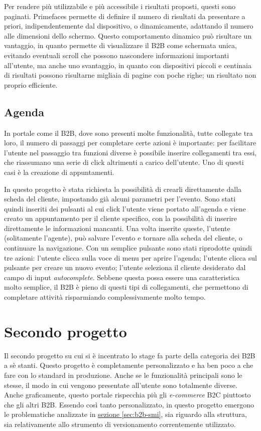 Per rendere più utilizzabile e più accessibile i risultati proposti, questi sono paginati. Primefaces permette di definire il numero di risultati da presentare a priori, indipendentemente dal dispositivo, o dinamicamente, adattando il numero alle dimensioni dello schermo. Questo comportamento dinamico può risultare un vantaggio, in quanto permette di visualizzare il B2B come schermata unica, evitando eventuali scroll che possono nascondere informazioni importanti all'utente, ma anche uno svantaggio, in quanto con dispositivi piccoli e centinaia di risultati possono risultarne migliaia di pagine con poche righe; un risultato non proprio efficiente.

\subsection{Agenda}
In portale come il B2B, dove sono presenti molte funzionalità, tutte collegate tra loro, il numero di passaggi per completare certe azioni è importante: per facilitare l'utente nel passaggio tra funzioni diverse è possibile inserire collegamenti tra essi, che riassumano una serie di click altrimenti a carico dell'utente. Uno di questi casi è la creazione di appuntamenti.

In questo progetto è stata richiesta la possibilità di crearli direttamente dalla scheda del cliente, impostando già alcuni parametri per l'evento. Sono stati quindi inseriti dei pulsanti al cui click l'utente viene portato all'agenda e viene creato un appuntamento per il cliente specifico, con la possibilità di inserire direttamente le informazioni mancanti. Una volta inserite queste, l'utente (solitamente l'agente), può salvare l'evento e tornare alla scheda del cliente, o continuare la navigazione. Con un semplice pulsante sono stati riprodotte quindi tre azioni: l'utente clicca sulla voce di menu per aprire l'agenda; l'utente clicca sul pulsante per creare un nuovo evento; l'utente seleziona il cliente desiderato dal campo di input \textit{autocomplete}. Sebbene questa possa essere una caratteristica molto semplice, il B2B è pieno di questi tipi di collegamenti, che permettono di completare attività risparmiando complessivamente molto tempo.

\section{Secondo progetto}
Il secondo progetto su cui si è incentrato lo stage fa parte della categoria dei B2B a sè stanti. Questo progetto è completamente personalizzato e ha ben poco a che fare con lo standard in produzione. Anche se le funzionalità principali sono le stesse, il modo in cui vengono presentate all'utente sono totalmente diverse. Anche graficamente, questo portale rispecchia più gli \textit{e-commerce} B2C piuttosto che gli altri B2B. Essendo così tanto personalizzato, in questo progetto emergono le problematiche analizzate in \hyperref[sec:b2b-smi]{sezione \ref{sec:b2b-smi}}, sia riguardo alla struttura, sia relativamente allo strumento di versionamento correntemente utilizzato.

